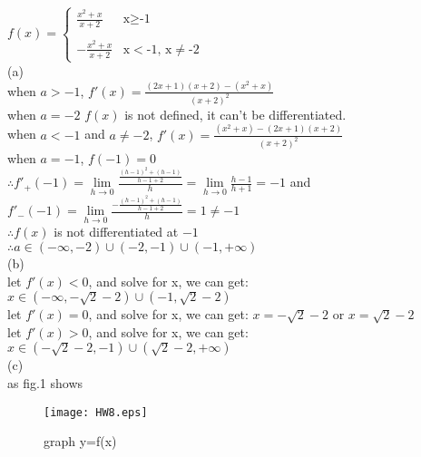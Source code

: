 \documentclass{article}
\begin{document}
$f(x)=\begin{cases}
\displaystyle\frac{x^2+x}{x+2} & \text{x$\geq$-1}\\
\qquad\\
\displaystyle-\frac{x^2+x}{x+2} & \text{x$<$-1, x$\neq$-2}
\end{cases}$\\

(a)\\

when $a>-1$, $f'(x)=\displaystyle\frac{(2x+1)(x+2)-(x^2+x)}{(x+2)^2}$\\

when $a=-2$ $f(x)$ is not defined, it can't be differentiated.\\

when $a<-1$ and $a\neq-2$, $f'(x)=\displaystyle\frac{(x^2+x)-(2x+1)(x+2)}{(x+2)^2}$\\

when $a=-1$, $f(-1)=0$\\

$\therefore$\qquad$f'_+(-1)=\lim \limits_{h \to 0}\displaystyle\frac{\frac{(h-1)^2+(h-1)}{h-1+2}}{h}=\lim \limits_{h \to 0}\frac{h-1}{h+1}=-1$ and $f'_-(-1)=\lim \limits_{h \to 0}\frac{-\frac{(h-1)^2+(h-1)}{h-1+2}}{h}=1\neq-1$\\

$\therefore$\qquad $f(x)$ is not differentiated at $-1$\\

$\therefore$\qquad$a\in(-\infty,-2)\cup(-2,-1)\cup(-1,+\infty)$\\

(b)\\

let $f'(x)<0$, and solve for x, we can get: $x\in(-\infty,-\sqrt{2}-2)\cup(-1,\sqrt{2}-2)$\\

let $f'(x)=0$, and solve for x, we can get: $x=-\sqrt{2}-2$ or $x=\sqrt{2}-2$\\

let $f'(x)>0$, and solve for x, we can get: $x\in(-\sqrt{2}-2,-1)\cup(\sqrt{2}-2,+\infty)$\\

(c)\\

as fig.1 shows\\

\begin{figure}[H]
  \centering
  \texttt{[image: HW8.eps]}\\
  \caption{graph y=f(x)}\label{fig.1}
\end{figure}
\end{document}
